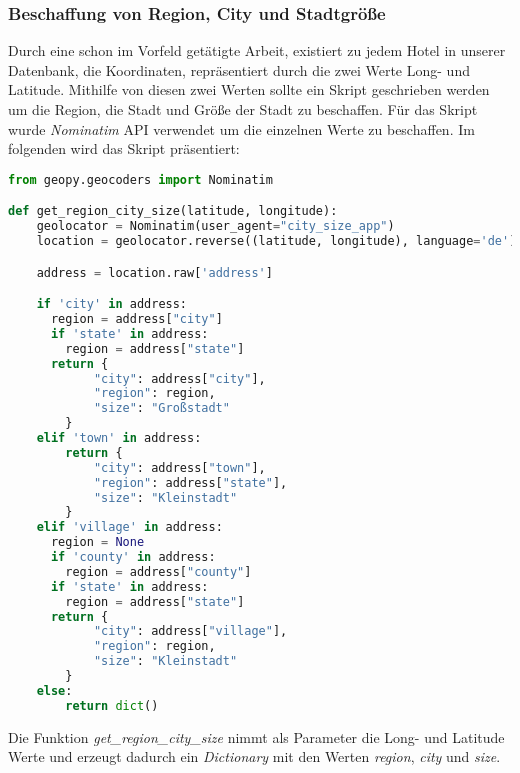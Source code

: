 \subsubsection{Beschaffung von Region, City und Stadtgröße}
\label{subsubsec:region_city_size}
Durch eine schon im Vorfeld getätigte Arbeit, existiert zu jedem Hotel in unserer Datenbank, die Koordinaten, repräsentiert durch die zwei Werte Long- und Latitude. Mithilfe von diesen zwei Werten sollte ein Skript geschrieben werden um die Region, die Stadt und Größe der Stadt zu beschaffen. 
\newline
\newline
Für das Skript wurde \emph{Nominatim} API verwendet um die einzelnen Werte zu beschaffen. Im folgenden wird das Skript präsentiert:

\begin{lstlisting}[language=Python, label=lst:RS_Demo, caption=Einfaches Recommendation System für Film vorschläge]
    from geopy.geocoders import Nominatim

def get_region_city_size(latitude, longitude):
    geolocator = Nominatim(user_agent="city_size_app")
    location = geolocator.reverse((latitude, longitude), language='de')

    address = location.raw['address']

    if 'city' in address:
      region = address["city"]
      if 'state' in address:
        region = address["state"]
      return {
            "city": address["city"],
            "region": region,
            "size": "Großstadt"
        }
    elif 'town' in address:
        return {
            "city": address["town"],
            "region": address["state"],
            "size": "Kleinstadt"
        }
    elif 'village' in address:
      region = None
      if 'county' in address:
        region = address["county"]
      if 'state' in address:
        region = address["state"]
      return {
            "city": address["village"],
            "region": region,
            "size": "Kleinstadt"
        }
    else:
        return dict()
\end{lstlisting}

Die Funktion \emph{get\_region\_city\_size} nimmt als Parameter die Long- und Latitude Werte und erzeugt dadurch ein \emph{Dictionary} mit den Werten \emph{region}, \emph{city} und \emph{size}.
